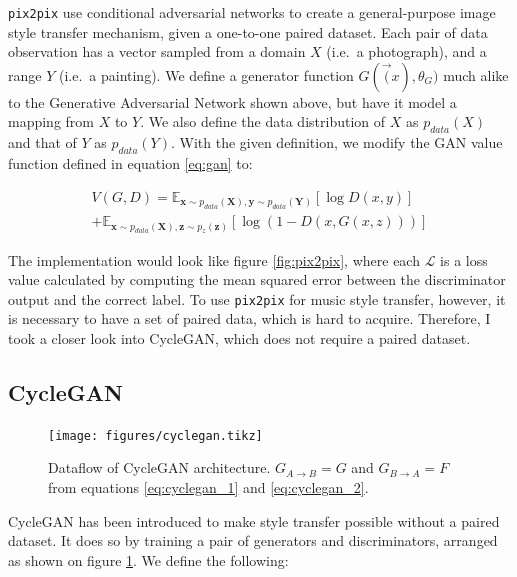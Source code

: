 \documentclass[]{report}
\begin{document}
\texttt{pix2pix} use conditional adversarial networks to create a
general-purpose image style transfer mechanism, given a one-to-one
paired dataset. Each pair of data observation has a vector sampled from
a domain \(X\) (i.e.~a photograph), and a range \(Y\) (i.e.~a painting).
We define a generator function \(G(\vec(x), \theta_G)\) much alike to
the Generative Adversarial Network shown above, but have it model a
mapping from \(X\) to \(Y\). We also define the data distribution of
\(X\) as \(p_{data}(X)\) and that of \(Y\) as \(p_{data}(Y)\). With the
given definition, we modify the GAN value function defined in equation
\ref{eq:gan} to:

\begin{multline}
    V(G, D) = \mathbb{E}_{\mathbf{x} \sim p_{data}(\mathbf{X}), \mathbf{y} \sim p_{data}(\mathbf{Y})}[\log D(x, y)] \\ +  \mathbb{E}_{\mathbf{x} \sim p_{data}(\mathbf{X}), \mathbf{z} \sim p_{z}(\mathbf{z})}[\log (1 - D(x, G(x, z)))] \label{eq:pix2pix}
\end{multline}

The implementation would look like figure \ref{fig:pix2pix}, where each
\(\mathcal{L}\) is a loss value calculated by computing the mean squared
error between the discriminator output and the correct label. To use
\texttt{pix2pix} for music style transfer, however, it is necessary to
have a set of paired data, which is hard to acquire. Therefore, I took a
closer look into CycleGAN, which does not require a paired dataset.

\hypertarget{cyclegan}{%
\subsection{CycleGAN}\label{cyclegan}}

\begin{figure}[h]
    \texttt{[image: figures/cyclegan.tikz]}
\centering
\caption{Dataflow of CycleGAN architecture. $G_{A \rightarrow B} = G$ and $G_{B \rightarrow A} = F$ from equations \ref{eq:cyclegan_1} and \ref{eq:cyclegan_2}. \label{fig:cyclegan}}
\end{figure}

CycleGAN has been introduced to make style transfer possible without a
paired dataset. It does so by training a pair of generators and
discriminators, arranged as shown on figure \ref{fig:cyclegan}. We
define the following:
\end{document}
